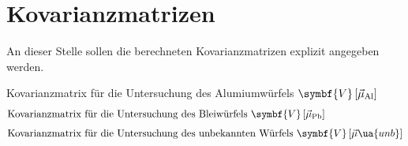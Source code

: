 \section{Kovarianzmatrizen}
An dieser Stelle sollen die berechneten Kovarianzmatrizen explizit angegeben werden.

Kovarianzmatrix für die Untersuchung des Alumiumwürfels $\symbf{V}\left[\vec{\mu}_{\ce{Al}}\right]$
\begin{align*}
  
\intertext{Kovarianzmatrix für die Untersuchung des Bleiwürfels $\symbf{V}\left[\vec{\mu}_{\ce{Pb}}\right]$}
  
\intertext{Kovarianzmatrix für die Untersuchung des unbekannten Würfels $\symbf{V}\left[\vec{\mu}\ua{unb}\right]$}
  
\end{align*}
